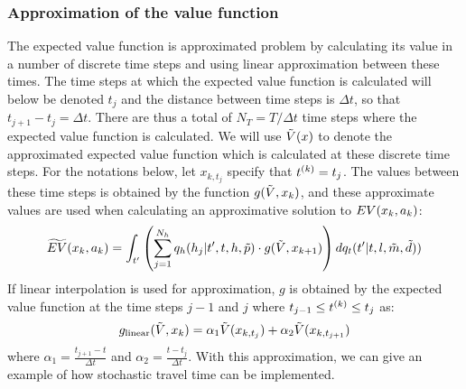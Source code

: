 \subsubsection{Approximation of the value function}
The expected value function is approximated problem by calculating its value in a number of discrete time steps and using linear approximation between these times. The time steps at which the expected value function is calculated will below be denoted $t_j$ and the distance between time steps is $\Delta t$, so that $t_{j+1}-t_j = \Delta t$. There are thus a total of $N_T = T/\Delta t$ time steps where the expected value function is calculated. We will use $\tilde{V}(x)$ to denote the approximated expected value function which is calculated at these discrete time steps. For the notations below, let $x_{k,t_j}$ specify that $t^{(k)} = t_j$. The values between these time steps is obtained by the function $g(\tilde{V},x_k)$, and these approximate values are used when calculating an approximative solution to $EV(x_k,a_k)$: 
\begin{equation} \label{eq:eutilapprox}
\begin{aligned}
\aeutil(x_k,a_k)=
\int_{t'} \left( \sum_{j=1}^{N_{\amem}}q_\amem(\amem_j|t', t,\amem,\act{p}) \cdot g(\eva,x_{k+1}) \right)dq_t(t'|t,l,\act{m},\act{d}))
\end{aligned}
\end{equation}
If linear interpolation is used for approximation, $g$ is obtained by the expected value function at the time steps $j-1$ and $j$ where $t_{j-1} \leq t^{(k)} \leq t_j $ as: 
\begin{equation}\label{eq:linap2}
g_\text{linear}(\eva,x_k) = \alpha_1 \eva(x_{k,t_j}) + \alpha_2 \eva(x_{k,t_{j+1}})
\end{equation}
where $\alpha_1 = \frac{t_{j+1}-t}{\Delta t}$ and $\alpha_2 = \frac{t-t_j}{\Delta t}$.
With this approximation, we can give an example of how stochastic travel time can be implemented.


